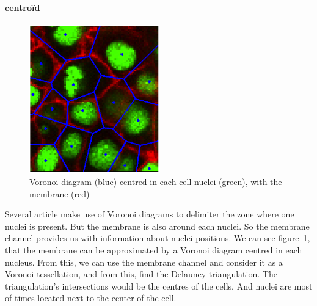 \paragraph{centroïd}


\begin{figure}[h]
\begin{center}
\leavevmode
\includegraphics[width=0.5\textwidth]{pictures/voronoiExample2D}
\end{center}
\caption{Voronoi diagram (blue) centred in each cell nuclei (green), with the membrane (red)}
\label{fig:voronoiExample2D}
\end{figure}
Several article make use of Voronoi diagrams to delimiter the zone where one nuclei is present.
But the membrane is also around each nuclei. So the membrane channel provides us with information about nuclei positions.
We can see figure~\ref{fig:voronoiExample2D}, that the membrane can be approximated by a Voronoi diagram centred in each nucleus.
From this, we can use the membrane channel and consider it as a Voronoi tessellation, and from this, find the Delauney triangulation.
The triangulation's intersections would be the centres of the cells. And nuclei are most of times located next to the center of the cell.

\paragraph*{}



